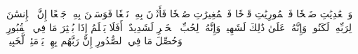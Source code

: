 وَٱلۡعَٰدِيَٰتِ ضَبۡحٗا
فَٱلۡمُورِيَٰتِ قَدۡحٗا
فَٱلۡمُغِيرَٰتِ صُبۡحٗا
فَأَثَرۡنَ بِهِۦ نَقۡعٗا
فَوَسَطۡنَ بِهِۦ جَمۡعًا
إِنَّ ٱلۡإِنسَٰنَ لِرَبِّهِۦ لَكَنُودٞ
وَإِنَّهُۥ عَلَىٰ ذَٰلِكَ لَشَهِيدٞ
وَإِنَّهُۥ لِحُبِّ ٱلۡخَيۡرِ لَشَدِيدٌ
۞أَفَلَا يَعۡلَمُ إِذَا بُعۡثِرَ مَا فِي ٱلۡقُبُورِ
وَحُصِّلَ مَا فِي ٱلصُّدُورِ
إِنَّ رَبَّهُم بِهِمۡ يَوۡمَئِذٖ لَّخَبِيرُۢ